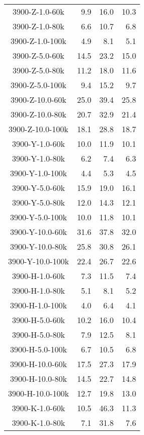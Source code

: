 \begin{longtable}{crrr}
    3900-Z-1.0-60k   &    9.9 &   16.0 &   10.3 \\
    3900-Z-1.0-80k   &    6.6 &   10.7 &    6.8 \\
    3900-Z-1.0-100k  &    4.9 &    8.1 &    5.1 \\
    3900-Z-5.0-60k   &   14.5 &   23.2 &   15.0 \\
    3900-Z-5.0-80k   &   11.2 &   18.0 &   11.6 \\
    3900-Z-5.0-100k  &    9.4 &   15.2 &    9.7 \\
    3900-Z-10.0-60k  &   25.0 &   39.4 &   25.8 \\
    3900-Z-10.0-80k  &   20.7 &   32.9 &   21.4 \\
    3900-Z-10.0-100k &   18.1 &   28.8 &   18.7 \\
    3900-Y-1.0-60k   &   10.0 &   11.9 &   10.1 \\
    3900-Y-1.0-80k   &    6.2 &    7.4 &    6.3 \\
    3900-Y-1.0-100k  &    4.4 &    5.3 &    4.5 \\
    3900-Y-5.0-60k   &   15.9 &   19.0 &   16.1 \\
    3900-Y-5.0-80k   &   12.0 &   14.3 &   12.1 \\
    3900-Y-5.0-100k  &   10.0 &   11.8 &   10.1 \\
    3900-Y-10.0-60k  &   31.6 &   37.8 &   32.0 \\
    3900-Y-10.0-80k  &   25.8 &   30.8 &   26.1 \\
    3900-Y-10.0-100k &   22.4 &   26.7 &   22.6 \\
    3900-H-1.0-60k   &    7.3 &   11.5 &    7.4 \\
    3900-H-1.0-80k   &    5.1 &    8.1 &    5.2 \\
    3900-H-1.0-100k  &    4.0 &    6.4 &    4.1 \\
    3900-H-5.0-60k   &   10.2 &   16.0 &   10.4 \\
    3900-H-5.0-80k   &    7.9 &   12.5 &    8.1 \\
    3900-H-5.0-100k  &    6.7 &   10.5 &    6.8 \\
    3900-H-10.0-60k  &   17.5 &   27.3 &   17.9 \\
    3900-H-10.0-80k  &   14.5 &   22.7 &   14.8 \\
    3900-H-10.0-100k &   12.7 &   19.8 &   13.0 \\
    3900-K-1.0-60k   &   10.5 &   46.3 &   11.3 \\
    3900-K-1.0-80k   &    7.1 &   31.8 &    7.6 \\

\end{longtable}
